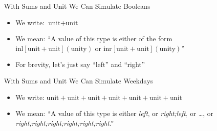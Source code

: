 \documentclass{beamer}
\begin{document}
\begin{frame}{With Sums and Unit We Can Simulate Booleans}

  \begin{itemize}
    \item We write: $\text{unit} + \text{unit}$
    \item We mean: ``A value of this type is either of the form \\
          $\text{inl}[\text{unit} + \text{unit}](\text{unity})$
          or
          $\text{inr}[\text{unit} + \text{unit}](\text{unity})$''
    \item For brevity, let's just say ``left'' and ``right''
  \end{itemize}

  \begin{center}
  \end{center}

\end{frame}


\begin{frame}{With Sums and Unit We Can Simulate Weekdays}

  \begin{itemize}
    \item We write: $\text{unit} + \text{unit} + \text{unit} + \text{unit} + \text{unit} + \text{unit} + \text{unit}$
    \item We mean: ``A value of this type is either \emph{left}, or
    \emph{right;left}, or \ldots, or \emph{right;right;right;right;right;right}.''
  \end{itemize}

  \begin{center}
  \end{center}

\end{frame}
\end{document}
